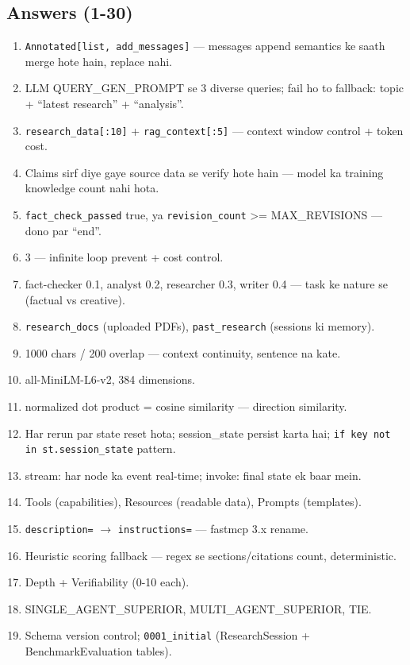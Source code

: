 \subsection{Answers (1-30)}

\begin{enumerate}[label=\arabic*.]
\item \texttt{Annotated[list, add\_messages]} --- messages append semantics ke saath merge hote hain, replace nahi.
\item LLM QUERY\_GEN\_PROMPT se 3 diverse queries; fail ho to fallback: topic + ``latest research'' + ``analysis''.
\item \texttt{research\_data[:10]} + \texttt{rag\_context[:5]} --- context window control + token cost.
\item Claims sirf diye gaye source data se verify hote hain --- model ka training knowledge count nahi hota.
\item \texttt{fact\_check\_passed} true, ya \texttt{revision\_count} >= MAX\_REVISIONS --- dono par ``end''.
\item 3 --- infinite loop prevent + cost control.
\item fact-checker 0.1, analyst 0.2, researcher 0.3, writer 0.4 --- task ke nature se (factual vs creative).
\item \texttt{research\_docs} (uploaded PDFs), \texttt{past\_research} (sessions ki memory).
\item 1000 chars / 200 overlap --- context continuity, sentence na kate.
\item all-MiniLM-L6-v2, 384 dimensions.
\item normalized dot product = cosine similarity --- direction similarity.
\item Har rerun par state reset hota; session\_state persist karta hai; \texttt{if key not in st.session\_state} pattern.
\item stream: har node ka event real-time; invoke: final state ek baar mein.
\item Tools (capabilities), Resources (readable data), Prompts (templates).
\item \texttt{description=} $\rightarrow$ \texttt{instructions=} --- fastmcp 3.x rename.
\item Heuristic scoring fallback --- regex se sections/citations count, deterministic.
\item Depth + Verifiability (0-10 each).
\item SINGLE\_AGENT\_SUPERIOR, MULTI\_AGENT\_SUPERIOR, TIE.
\item Schema version control; \texttt{0001\_initial} (ResearchSession + BenchmarkEvaluation tables).

\end{enumerate}
